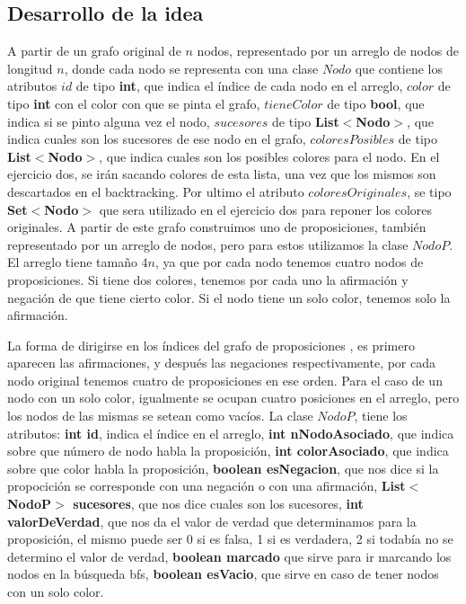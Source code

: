 \subsection{Desarrollo de la idea}

A partir de un grafo original de $ n $ nodos, representado por un arreglo de nodos de longitud $ n $, donde cada nodo se representa con una clase $ Nodo $ que contiene los atributos $ id $ de tipo \textbf{int}, que indica el índice de cada nodo en el arreglo,  $  color $ de tipo \textbf{int} con el color con que se pinta el grafo, $ tieneColor $ de tipo \textbf{bool}, que indica si se pinto alguna vez el nodo, $ sucesores $ de tipo \textbf{List$ < $Nodo$ > $}, que indica cuales son los sucesores de ese nodo en el grafo, $ coloresPosibles $ de tipo \textbf{List$<$Nodo$>$}, que indica cuales son los posibles colores para el nodo. En el ejercicio dos, se irán sacando colores de esta lista, una vez que los mismos son descartados en el backtracking. Por ultimo el atributo $ coloresOriginales $, se tipo \textbf{Set$<$Nodo$>$} que sera utilizado en el ejercicio dos para reponer los colores originales. A partir de este grafo construimos uno de proposiciones, también representado por un arreglo de nodos, pero para estos utilizamos la clase $ NodoP $. El arreglo tiene tamaño $ 4 n $, ya que por cada nodo tenemos cuatro nodos de proposiciones. Si tiene dos colores, tenemos por cada uno la afirmación y negación de que tiene cierto color. Si el nodo tiene un solo color, tenemos solo la afirmación.

 La forma de dirigirse en los índices del grafo de proposiciones , es primero aparecen las afirmaciones, y después las negaciones respectivamente, por cada nodo original tenemos cuatro de proposiciones en ese orden. Para el caso de un nodo con un solo color, igualmente se ocupan cuatro posiciones en el arreglo, pero los nodos de las mismas se setean como vacíos. La clase $ NodoP $, tiene los atributos: \textbf{int id}, indica el índice en el arreglo, \textbf{int nNodoAsociado}, que indica sobre que número de nodo habla la proposición, \textbf{int colorAsociado}, que indica sobre que color habla la proposición, \textbf{boolean esNegacion}, que nos dice si la propocición se corresponde con una negación o con una afirmación, \textbf{List$<$NodoP$>$ sucesores}, que nos dice cuales son los sucesores, \textbf{int valorDeVerdad}, que nos da el valor de verdad que determinamos para la proposición, el mismo puede ser 0 si es falsa, 1 si es verdadera, 2 si todabía no se determino el valor de verdad, \textbf{boolean marcado} que sirve para ir marcando los nodos en la búsqueda bfs, \textbf{boolean esVacio}, que sirve en caso de tener nodos con un solo color.
 
